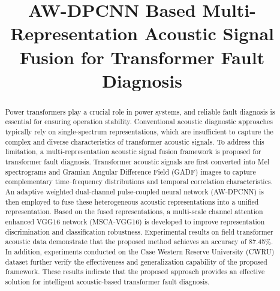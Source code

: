 \documentclass[anonymous]{iopjournal}
\begin{document}
\title{AW-DPCNN Based Multi-Representation Acoustic Signal Fusion for Transformer Fault Diagnosis}


\begin{abstract}
Power transformers play a crucial role in power systems, and reliable fault diagnosis is essential for ensuring operation stability. Conventional acoustic diagnostic approaches typically rely on single-spectrum representations, which are insufficient to capture the complex and diverse characteristics of transformer acoustic signals. To address this limitation, a multi-representation acoustic signal fusion framework is proposed for transformer fault diagnosis. Transformer acoustic signals are first converted into Mel spectrograms and Gramian Angular Difference Field (GADF) images to capture complementary time–frequency distributions and temporal correlation characteristics. An adaptive weighted dual-channel pulse-coupled neural network (AW-DPCNN) is then employed to fuse these heterogeneous acoustic representations into a unified representation. Based on the fused representations, a multi-scale channel attention enhanced VGG16 network (MSCA-VGG16) is developed to improve representation discrimination and classification robustness. Experimental results on field transformer acoustic data demonstrate that the proposed method achieves an accuracy of 87.45\%. In addition, experiments conducted on the Case Western Reserve University (CWRU) dataset further verify the effectiveness and generalization capability of the proposed framework. These results indicate that the proposed approach provides an effective solution for intelligent acoustic-based transformer fault diagnosis.
\end{abstract}
\end{document}
